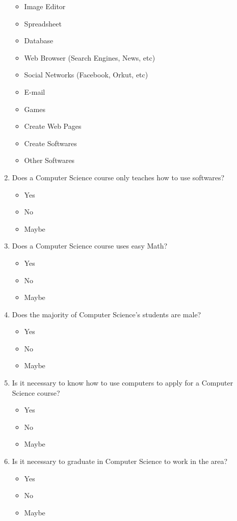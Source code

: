 \begin{enumerate}
\begin{itemize}
			\item Image Editor
			\item Spreadsheet
			\item Database
			\item Web Browser (Search Engines, News, etc)
			\item Social Networks (Facebook, Orkut, etc)
			\item E-mail
			\item Games
			\item Create Web Pages
			\item Create Softwares
			\item Other Softwares
		\end{itemize}
	\item Does a Computer Science course only teaches how to use softwares?
		\begin{itemize}
			\item Yes
			\item No
			\item Maybe
		\end{itemize}
	\item Does a Computer Science course uses easy Math?
		\begin{itemize}
			\item Yes
			\item No
			\item Maybe
		\end{itemize}	
	\item Does the majority of Computer Science's students are male?
		\begin{itemize}
			\item Yes
			\item No
			\item Maybe
		\end{itemize}
	\item Is it necessary to know how to use computers to apply for a Computer Science course?
		\begin{itemize}
			\item Yes
			\item No
			\item Maybe
		\end{itemize}							
	\item Is it necessary to graduate in Computer Science to work in the area?
		\begin{itemize}
			\item Yes
			\item No
			\item Maybe

\end{itemize}
\end{enumerate}
